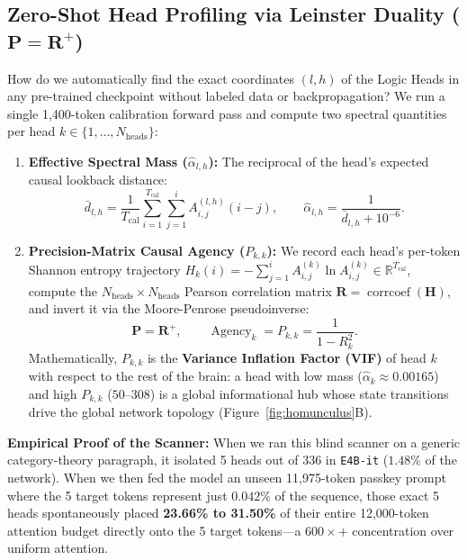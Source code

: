 \documentclass[11pt,letterpaper]{article}
\begin{document}
\subsection{Zero-Shot Head Profiling via Leinster Duality (\texorpdfstring{$\mathbf{P} = \mathbf{R}^+$}{P = pinv(R)})}
How do we automatically find the exact coordinates $(l, h)$ of the Logic Heads in any pre-trained checkpoint without labeled data or backpropagation? We run a single 1,400-token calibration forward pass and compute two spectral quantities per head $k \in \{1, \dots, N_{\text{heads}}\}$:
\begin{enumerate}
    \item \textbf{Effective Spectral Mass ($\hat{\alpha}_{l,h}$):} The reciprocal of the head's expected causal lookback distance:
    \begin{equation}
    \bar{d}_{l,h} = \frac{1}{T_{\text{cal}}} \sum_{i=1}^{T_{\text{cal}}} \sum_{j=1}^{i} A^{(l,h)}_{i,j} (i - j), \qquad
    \hat{\alpha}_{l,h} = \frac{1}{\bar{d}_{l,h} + 10^{-6}}.
    \end{equation}
    \item \textbf{Precision-Matrix Causal Agency ($P_{k,k}$):} We record each head's per-token Shannon entropy trajectory $H_k(i) = -\sum_{j=1}^i A^{(k)}_{i,j} \ln A^{(k)}_{i,j} \in \mathbb{R}^{T_{\text{cal}}}$, compute the $N_{\text{heads}} \times N_{\text{heads}}$ Pearson correlation matrix $\mathbf{R} = \operatorname{corrcoef}(\mathbf{H})$, and invert it via the Moore-Penrose pseudoinverse:
    \begin{equation}
    \mathbf{P} = \mathbf{R}^+, \qquad \operatorname{Agency}_k = P_{k,k} = \frac{1}{1 - R_k^2}.
    \end{equation}
    Mathematically, $P_{k,k}$ is the \textbf{Variance Inflation Factor (VIF)} of head $k$ with respect to the rest of the brain: a head with low mass ($\hat{\alpha}_k \approx 0.00165$) and high $P_{k,k}$ ($50\text{--}308$) is a global informational hub whose state transitions drive the global network topology (Figure~\ref{fig:homunculus}B).
\end{enumerate}

\noindent
\textbf{Empirical Proof of the Scanner:} When we ran this blind scanner on a generic category-theory paragraph, it isolated 5 heads out of 336 in \texttt{E4B-it} ($1.48\%$ of the network). When we then fed the model an unseen 11,975-token passkey prompt where the 5 target tokens represent just $0.042\%$ of the sequence, those exact 5 heads spontaneously placed \textbf{23.66\% to 31.50\%} of their entire 12,000-token attention budget directly onto the 5 target tokens---a \textbf{$600\times+$} concentration over uniform attention.
\end{document}
